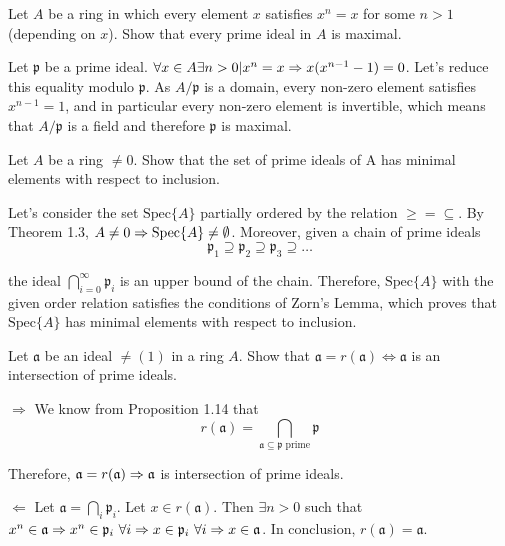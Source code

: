 \begin{ex}
	Let $A$ be a ring in which every element $x$ satisfies $x^n = x$ for some $n > 1$ (depending on $x$). Show that every prime ideal in $A$ is maximal.
\end{ex}

\begin{sol}
	Let $\mathfrak{p}$ be a prime ideal. $\forall x \in A \exists n > 0 | x^n = x \Rightarrow x(x^{n-1} -1) = 0$. Let's reduce this equality modulo $\mathfrak{p}$. As $A/\mathfrak{p}$ is a domain, every non-zero element satisfies $x^{n-1} = 1$, and in particular every non-zero element is invertible, which means that $A/\mathfrak{p}$ is a field and therefore $\mathfrak{p}$ is maximal.
\end{sol}

\begin{ex}
 Let $A$ be a ring $\neq 0$. Show that the set of prime ideals of A has minimal elements with respect to inclusion.
\end{ex}

\begin{sol}
	Let's consider the set $\text{Spec}\{A\}$ partially ordered by the relation $\geq = \subseteq$. By Theorem 1.3, $A \neq 0 \Rightarrow \text{Spec}\{A\} \neq \emptyset$. Moreover, given a chain of prime ideals 
	\[
		\mathfrak{p}_1 \supseteq \mathfrak{p}_2 \supseteq \mathfrak{p}_3 \supseteq \dots
	\]

	the ideal $\bigcap_{i = 0}^\infty \mathfrak{p}_i$ is an upper bound of the chain. Therefore, $\text{Spec}\{A\}$ with the given order relation satisfies the conditions of Zorn's Lemma, which proves that $\text{Spec}\{A\}$ has minimal elements with respect to inclusion.
\end{sol}

\begin{ex}
	Let $\mathfrak{a}$ be an ideal $\neq (1)$ in a ring $A$. Show that $\mathfrak{a} = r(\mathfrak{a}) \iff \mathfrak{a}$ is an intersection of prime ideals.
\end{ex}

\begin{sol}
$\boxed{\Rightarrow}$ We know from Proposition 1.14 that
\[
r(\mathfrak{a}) = \bigcap_{\mathfrak{a} \subseteq \mathfrak{p} \text{ prime}} \mathfrak{p}
\]

Therefore, $\mathfrak{a} = r(\mathfrak{a}) \Rightarrow \mathfrak{a}$ is intersection of prime ideals.

$\boxed{\Leftarrow}$ Let $\mathfrak{a} = \bigcap_i \mathfrak{p}_i$. Let $x \in r(\mathfrak{a})$. Then $\exists n > 0$ such that $x^n \in \mathfrak{a} \Rightarrow x^n \in \mathfrak{p}_i \, \, \forall i \Rightarrow x \in \mathfrak{p}_i \, \, \forall i \Rightarrow x \in \mathfrak{a}$. In conclusion, $r(\mathfrak{a}) = \mathfrak{a}$.

\end{sol}

